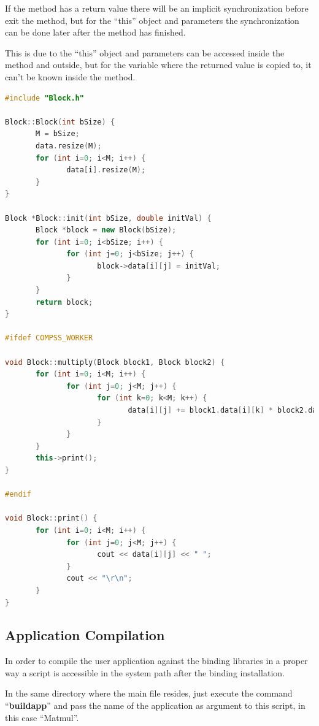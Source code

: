If the method has a return value there will be an implicit synchronization before exit the method, 
but for the “this” object and parameters the synchronization can be done later after the method has finished.

This is due to the ``this'' object and parameters can be accessed inside the method and outside, but for the 
variable where the returned value is copied to, it can’t be known inside the method.

\begin{lstlisting}[language=C++]
#include "Block.h"

Block::Block(int bSize) {
       M = bSize;
       data.resize(M);
       for (int i=0; i<M; i++) {
              data[i].resize(M);
       }
}

Block *Block::init(int bSize, double initVal) {
       Block *block = new Block(bSize);
       for (int i=0; i<bSize; i++) {
              for (int j=0; j<bSize; j++) {
                     block->data[i][j] = initVal;
              }
       }
       return block;
}

#ifdef COMPSS_WORKER

void Block::multiply(Block block1, Block block2) {
       for (int i=0; i<M; i++) {
              for (int j=0; j<M; j++) {
                     for (int k=0; k<M; k++) {
                            data[i][j] += block1.data[i][k] * block2.data[k][j];
                     }
              }
       }
       this->print();
}

#endif

void Block::print() {
       for (int i=0; i<M; i++) {
              for (int j=0; j<M; j++) {
                     cout << data[i][j] << " ";
              }
              cout << "\r\n";
       }
}
\end{lstlisting}

\subsection{Application Compilation}
In order to compile the user application against the binding libraries in a proper way a script is 
accessible in the system path after the binding installation.

In the same directory where the main file resides, just execute the command ``{\bf buildapp}'' and 
pass the name of the application as argument to this script, in this case ``Matmul''.

